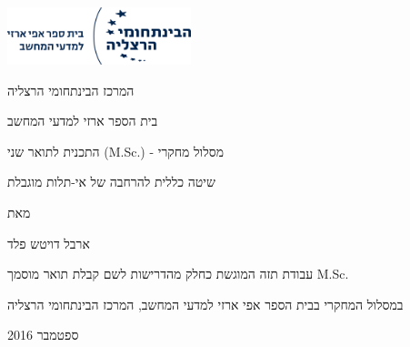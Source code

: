 \documentclass[12pt]{report}
\begin{document}
\begin{titlepage}
	\centering
	\includegraphics[width=0.4\textwidth]{IDC_logo_hebrew}\par\vspace{2cm}
	{\huge \begin{hebrew}{המרכז הבינתחומי הרצליה}\end{hebrew} \par}
	{\Large \begin{hebrew}{בית הספר ארזי למדעי המחשב}\end{hebrew} \par}
	{\Large \begin{hebrew}{התכנית לתואר שני (M.Sc.) - מסלול מחקרי}\end{hebrew} \par}
	
	\vspace{1cm}
	
	\vspace{1.5cm}
	{\Huge \begin{hebrew} שיטה כללית להרחבה של אי-תלות מוגבלת \end{hebrew} \par}
	\vspace{3cm}
	{\large \begin{hebrew}{מאת}\end{hebrew}\par}
	{\large\bfseries \begin{hebrew} ארבל דויטש פלד \end{hebrew} \par}
	
	\vspace{2cm}
	
	{\begin{hebrew}{עבודת תזה המוגשת כחלק מהדרישות לשם קבלת תואר מוסמך M.Sc.}\end{hebrew}\par}
	{\begin{hebrew}{במסלול המחקרי בבית הספר אפי ארזי למדעי המחשב, המרכז הבינתחומי הרצליה}\end{hebrew}\par}
	
	\vfill
	
	{\large\begin{hebrew}{ספטמבר 2016}\end{hebrew}\par}
\end{titlepage}
\end{document}
